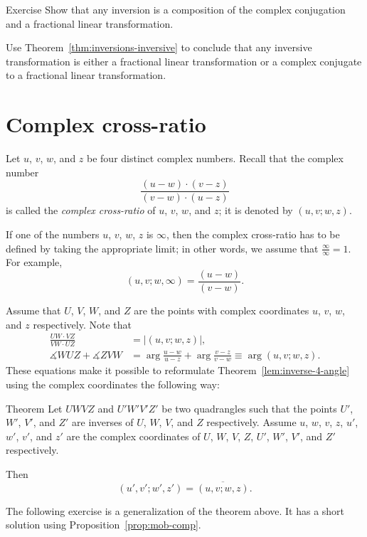 \begin{thm}{Exercise}\label{ex:inversion-Mob}
Show that any inversion is a composition of the complex conjugation and a fractional linear transformation.

Use Theorem~\ref{thm:inversions-inversive} to conclude that any inversive transformation is either a fractional linear transformation or a complex conjugate to a fractional linear transformation.
\end{thm}

\section{Complex cross-ratio}

Let $u$, $v$, $w$, and $z$ be four distinct complex numbers.
Recall that 
the complex number
$$
\frac{(u-w)\cdot(v-z)}{(v-w)\cdot(u-z)}$$
is called the \emph{complex cross-ratio} of $u$, $v$, $w$, and $z$; 
it is denoted by $(u,v;w,z)$.

If one of the numbers $u$, $v$, $w$, $z$ is $\infty$, 
then the complex cross-ratio has to be defined by taking the appropriate limit; in other words, we assume that $\frac\infty\infty=1$.
For example,
$$(u, v; w, \infty)=\frac{(u-w)}{(v-w)}.$$

Assume that $U$, $V$, $W$, and  $Z$ are the points with complex coordinates  
$u$, $v$, $w$, and $z$ respectively.
Note that 
\begin{align*}
\frac{UW\cdot VZ}{VW\cdot UZ}&=|(u,v;w,z)|,
\\
\measuredangle WUZ +\measuredangle ZVW&=\arg\frac{u-w}{u-z}+\arg\frac{v-z}{v-w}\equiv \arg(u,v;w,z).
\end{align*}
These equations make it possible to reformulate Theorem~\ref{lem:inverse-4-angle} using the complex coordinates
the following way:

\begin{thm}{Theorem}\label{lem:inverse-4-angle-C}
Let $UWVZ$ and $U'W'V'Z'$  be two quadrangles 
such that the points $U'$, $W'$, $V'$, and $Z'$ are inverses of $U$, $W$, $V$, and $Z$ respectively.
Assume $u$, $w$, $v$, $z$, $u'$, $w'$, $v'$, and $z'$ are the complex coordinates of $U$, $W$, $V$, $Z$, $U'$, $W'$, $V'$, and $Z'$ respectively.

Then 
$$(u',v';w',z')=\overline{(u,v;w,z)}.$$

\end{thm}

The following exercise is a generalization of the theorem above.
It has a short solution using Proposition~\ref{prop:mob-comp}.

